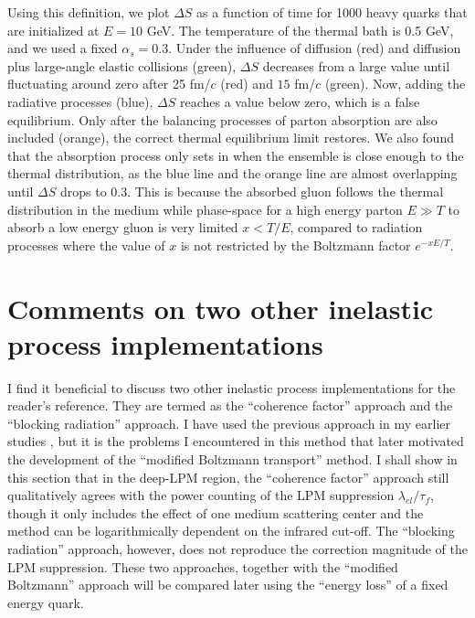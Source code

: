 Using this definition, we plot $\Delta S$ as a function of time for 1000 heavy quarks that are initialized at $E=10$ GeV.
The temperature of the thermal bath is 0.5 GeV, and we used a fixed $\alpha_s = 0.3$.
Under the influence of diffusion (red) and diffusion plus large-angle elastic collisions (green), $\Delta S$ decreases from a large value until fluctuating around zero after 25 fm/$c$ (red) and $15$ fm/$c$ (green).
Now, adding the radiative processes (blue), $\Delta S$ reaches a value below zero, which is a false equilibrium.
Only after the balancing processes of parton absorption are also included (orange), the correct thermal equilibrium limit restores. 
We also found that the absorption process only sets in when the ensemble is close enough to the thermal distribution, as the blue line and the orange line are almost overlapping until $\Delta S$ drops to 0.3.
This is because the absorbed gluon follows the thermal distribution in the medium while phase-space for a high energy parton $E\gg T$ to absorb a low energy gluon is very limited $x<T/E$, compared to radiation processes where the value of $x$ is not restricted by the Boltzmann factor $e^{-xE/T}$.

\section{Comments on two other inelastic process implementations}
\label{section:compare_former}
I find it beneficial to discuss two other inelastic process implementations for the reader's reference. 
They are termed as the ``coherence factor'' approach and the ``blocking radiation'' approach.
I have used the previous approach in my earlier studies \cite{Ke:2018tsh}, but it is the problems I encountered in this method that later motivated the development of the ``modified Boltzmann transport'' method. 
I shall show in this section that in the deep-LPM region, the ``coherence factor'' approach still qualitatively agrees with the power counting of the LPM suppression $\lambda_{el}/\tau_f$, though it only includes the effect of one medium scattering center and the method can be logarithmically dependent on the infrared cut-off.
The ``blocking radiation'' approach, however,  does not reproduce the correction magnitude of the LPM suppression.
These two approaches, together with the ``modified Boltzmann'' approach will be compared later using the ``energy loss'' of a fixed energy quark.

